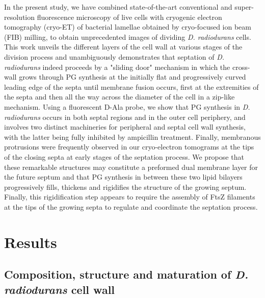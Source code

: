 In the present study, we have combined state-of-the-art conventional and super-resolution fluorescence microscopy of live cells with cryogenic electron tomography (cryo-ET) of bacterial lamellae obtained by cryo-focused ion beam (FIB) milling, to obtain unprecedented images of dividing \textit{D. radiodurans} cells.
This work unveils the different layers of the cell wall at various stages of the division process and unambiguously demonstrates that septation of \textit{D. radiodurans} indeed proceeds by a "sliding door" mechanism in which the cross-wall grows through PG synthesis at the initially flat and progressively curved leading edge of the septa until membrane fusion occurs, first at the extremities of the septa and then all the way across the diameter of the cell in a zip-like mechanism.
Using a fluorescent D-Ala probe, we show that PG synthesis in \textit{D. radiodurans} occurs in both septal regions and in the outer cell periphery, and involves two distinct machineries for peripheral and septal cell wall synthesis, with the latter being fully inhibited by ampicillin treatment.
Finally, membranous protrusions were frequently observed in our cryo-electron tomograms at the tips of the closing septa at early stages of the septation process.
We propose that these remarkable structures may constitute a preformed dual membrane layer for the future septum and that PG synthesis in between these two lipid bilayers progressively fills, thickens and rigidifies the structure of the growing septum.
Finally, this rigidification step appears to require the assembly of FtsZ filaments at the tips of the growing septa to regulate and coordinate the septation process.

\section{Results}

\subsection{Composition, structure and maturation of \textit{D. radiodurans} cell wall}

